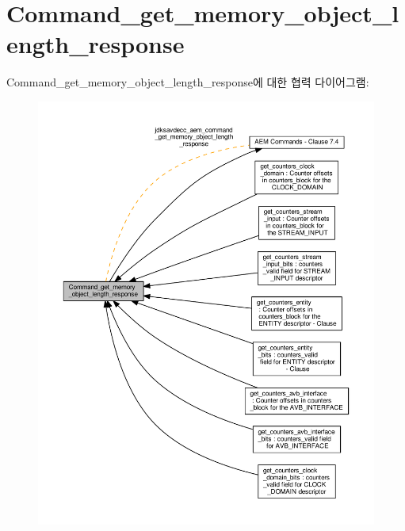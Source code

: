 \hypertarget{group__command__get__memory__object__length__response}{}\section{Command\+\_\+get\+\_\+memory\+\_\+object\+\_\+length\+\_\+response}
\label{group__command__get__memory__object__length__response}
Command\+\_\+get\+\_\+memory\+\_\+object\+\_\+length\+\_\+response에 대한 협력 다이어그램\+:
\nopagebreak
\begin{figure}[H]
\begin{center}
\leavevmode
\includegraphics[width=350pt]{group__command__get__memory__object__length__response}
\end{center}
\end{figure}
